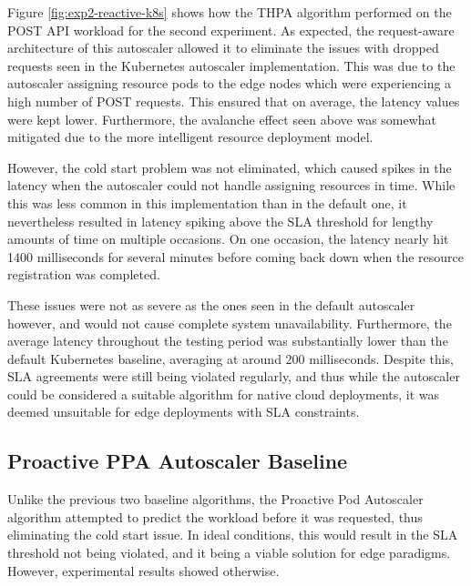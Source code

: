 Figure \ref{fig:exp2-reactive-k8s} shows how the THPA algorithm performed on the POST API workload for the second experiment. As expected, the request-aware architecture of this autoscaler allowed it to eliminate the issues with dropped requests seen in the Kubernetes autoscaler implementation. This was due to the autoscaler assigning resource pods to the edge nodes which were experiencing a high number of POST requests. This ensured that on average, the latency values were kept lower. Furthermore, the avalanche effect seen above was somewhat mitigated due to the more intelligent resource deployment model.\par

However, the cold start problem was not eliminated, which caused spikes in the latency when the autoscaler could not handle assigning resources in time. While this was less common in this implementation than in the default one, it nevertheless resulted in latency spiking above the SLA threshold for lengthy amounts of time on multiple occasions. On one occasion, the latency nearly hit 1400 milliseconds for several minutes before coming back down when the resource registration was completed.\par

These issues were not as severe as the ones seen in the default autoscaler however, and would not cause complete system unavailability. Furthermore, the average latency throughout the testing period was substantially lower than the default Kubernetes baseline, averaging at around 200 milliseconds. Despite this, SLA agreements were still being violated regularly, and thus while the autoscaler could be considered a suitable algorithm for native cloud deployments, it was deemed unsuitable for edge deployments with SLA constraints.\par

\subsection {Proactive PPA Autoscaler Baseline}
\label{subsec:ch6-proactive-algo}

Unlike the previous two baseline algorithms, the Proactive Pod Autoscaler algorithm attempted to predict the workload before it was requested, thus eliminating the cold start issue. In ideal conditions, this would result in the SLA threshold not being violated, and it being a viable solution for edge paradigms. However, experimental results showed otherwise.\par

